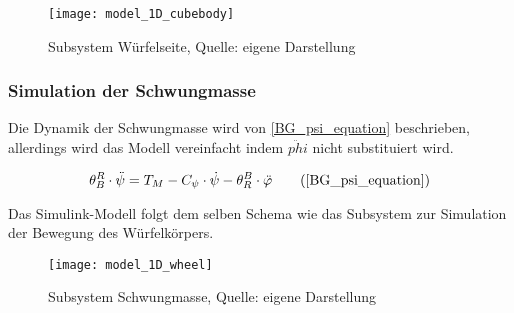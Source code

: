 \begin{figure}[h]
\label{Simulink_1DModell_CubeBody_pic}
\texttt{[image: model\_1D\_cubebody]}
\caption{Subsystem Würfelseite, Quelle: eigene Darstellung}
\end{figure}

\subsubsection{Simulation der Schwungmasse}
Die Dynamik der Schwungmasse wird von \ref{BG_psi_equation} beschrieben, allerdings wird das Modell vereinfacht indem $\ddot{phi}$ nicht substituiert wird.

\begin{equation}
{\theta}^R_B \cdot \ddot{\psi} = T_M - C_{\psi} \cdot \dot{\psi} - {\theta}^B_R \cdot \ddot{\varphi}\tag{\ref{BG_psi_equation}}
\end{equation}

Das Simulink-Modell folgt dem selben Schema wie das Subsystem zur Simulation der Bewegung des Würfelkörpers.

\begin{figure}[h]
\label{Simulink_1DModell_Wheel_pic}
\texttt{[image: model\_1D\_wheel]}
\caption{Subsystem Schwungmasse, Quelle: eigene Darstellung}
\end{figure}